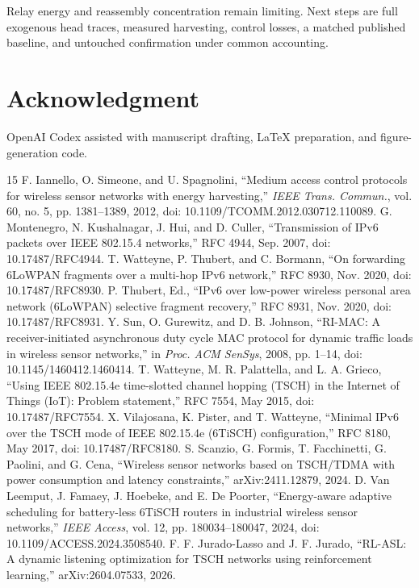 \documentclass[journal,10pt]{IEEEtran}
\begin{document}
Relay energy and reassembly concentration remain limiting. Next steps are full exogenous head traces, measured harvesting, control losses, a matched published baseline, and untouched confirmation under common accounting.

\section*{Acknowledgment}
OpenAI Codex assisted with manuscript drafting, LaTeX preparation, and figure-generation code.

\begin{thebibliography}{15}
 F. Iannello, O. Simeone, and U. Spagnolini, ``Medium access control protocols for wireless sensor networks with energy harvesting,'' \emph{IEEE Trans. Commun.}, vol. 60, no. 5, pp. 1381--1389, 2012, doi: 10.1109/TCOMM.2012.030712.110089.
 G. Montenegro, N. Kushalnagar, J. Hui, and D. Culler, ``Transmission of IPv6 packets over IEEE 802.15.4 networks,'' RFC 4944, Sep. 2007, doi: 10.17487/RFC4944.
 T. Watteyne, P. Thubert, and C. Bormann, ``On forwarding 6LoWPAN fragments over a multi-hop IPv6 network,'' RFC 8930, Nov. 2020, doi: 10.17487/RFC8930.
 P. Thubert, Ed., ``IPv6 over low-power wireless personal area network (6LoWPAN) selective fragment recovery,'' RFC 8931, Nov. 2020, doi: 10.17487/RFC8931.
 Y. Sun, O. Gurewitz, and D. B. Johnson, ``RI-MAC: A receiver-initiated asynchronous duty cycle MAC protocol for dynamic traffic loads in wireless sensor networks,'' in \emph{Proc. ACM SenSys}, 2008, pp. 1--14, doi: 10.1145/1460412.1460414.
 T. Watteyne, M. R. Palattella, and L. A. Grieco, ``Using IEEE 802.15.4e time-slotted channel hopping (TSCH) in the Internet of Things (IoT): Problem statement,'' RFC 7554, May 2015, doi: 10.17487/RFC7554.
 X. Vilajosana, K. Pister, and T. Watteyne, ``Minimal IPv6 over the TSCH mode of IEEE 802.15.4e (6TiSCH) configuration,'' RFC 8180, May 2017, doi: 10.17487/RFC8180.
 S. Scanzio, G. Formis, T. Facchinetti, G. Paolini, and G. Cena, ``Wireless sensor networks based on TSCH/TDMA with power consumption and latency constraints,'' arXiv:2411.12879, 2024.
 D. Van Leemput, J. Famaey, J. Hoebeke, and E. De Poorter, ``Energy-aware adaptive scheduling for battery-less 6TiSCH routers in industrial wireless sensor networks,'' \emph{IEEE Access}, vol. 12, pp. 180034--180047, 2024, doi: 10.1109/ACCESS.2024.3508540.
 F. F. Jurado-Lasso and J. F. Jurado, ``RL-ASL: A dynamic listening optimization for TSCH networks using reinforcement learning,'' arXiv:2604.07533, 2026.

\end{thebibliography}
\end{document}
